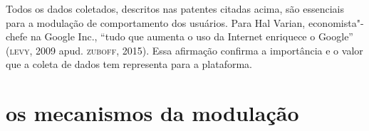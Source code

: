 
Todos os dados coletados, descritos nas patentes citadas acima, são
essenciais para a modulação de comportamento dos usuários. Para Hal
Varian, economista"-chefe na Google Inc., ``tudo que aumenta o uso da
Internet enriquece o Google'' (\textsc{levy}, 2009 apud. \textsc{zuboff}, 2015). Essa
afirmação confirma a importância e o valor que a coleta de dados tem
representa para a plataforma.

\section{os mecanismos da modulação}

